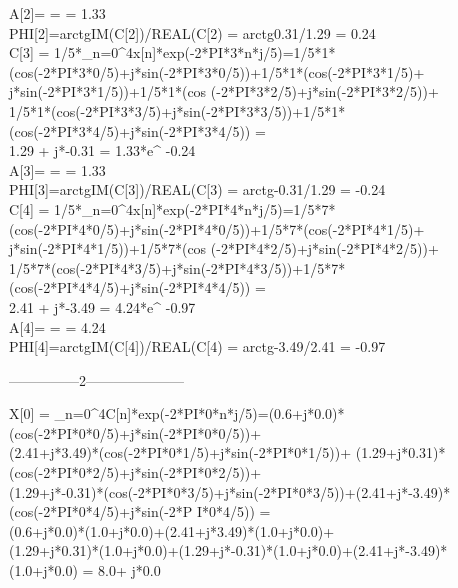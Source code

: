 \documentclass[landscape,12pt]{article}
\begin{document}
A[2]=\sqrt{REAL(C[2])^2+IM(C[2)^2} =  = 1.33\\
PHI[2]=arctg{IM(C[2])/REAL(C[2)} = arctg{0.31/1.29} = 0.24\\

C[3] = 1/5*\sum_{n=0}^{4}{x[n]*exp(-2*PI*3*n*j/5)}=1/5*1*(cos(-2*PI*3*0/5)+j*sin(-2*PI*3*0/5))+1/5*1*(cos(-2*PI*3*1/5)+\\j*sin(-2*PI*3*1/5))+1/5*1*(cos
(-2*PI*3*2/5)+j*sin(-2*PI*3*2/5))+\\1/5*1*(cos(-2*PI*3*3/5)+j*sin(-2*PI*3*3/5))+1/5*1*(cos(-2*PI*3*4/5)+j*sin(-2*PI*3*4/5)) = \\1.29 + j*-0.31 = 1.33*e^
{-0.24}\\

A[3]=\sqrt{REAL(C[3])^2+IM(C[3)^2} =  = 1.33\\
PHI[3]=arctg{IM(C[3])/REAL(C[3)} = arctg{-0.31/1.29} = -0.24\\

C[4] = 1/5*\sum_{n=0}^{4}{x[n]*exp(-2*PI*4*n*j/5)}=1/5*7*(cos(-2*PI*4*0/5)+j*sin(-2*PI*4*0/5))+1/5*7*(cos(-2*PI*4*1/5)+\\j*sin(-2*PI*4*1/5))+1/5*7*(cos
(-2*PI*4*2/5)+j*sin(-2*PI*4*2/5))+\\1/5*7*(cos(-2*PI*4*3/5)+j*sin(-2*PI*4*3/5))+1/5*7*(cos(-2*PI*4*4/5)+j*sin(-2*PI*4*4/5)) =\\ 2.41 + j*-3.49 = 4.24*e^
{-0.97}\\

A[4]=\sqrt{REAL(C[4])^2+IM(C[4)^2} =  = 4.24\\
PHI[4]=arctg{IM(C[4])/REAL(C[4)} = arctg{-3.49/2.41} = -0.97\\


\begin{center}
---------------2---------------------
\end{center}
X[0] = \sum_{n=0}^{4}{C[n]*exp(-2*PI*0*n*j/5)}=(0.6+j*0.0)*(cos(-2*PI*0*0/5)+j*sin(-2*PI*0*0/5))+\\(2.41+j*3.49)*(cos(-2*PI*0*1/5)+j*sin(-2*PI*0*1/5))+
(1.29+j*0.31)*(cos(-2*PI*0*2/5)+j*sin(-2*PI*0*2/5))+\\(1.29+j*-0.31)*(cos(-2*PI*0*3/5)+j*sin(-2*PI*0*3/5))+(2.41+j*-3.49)*(cos(-2*PI*0*4/5)+j*sin(-2*P
I*0*4/5)) =\\ (0.6+j*0.0)*(1.0+j*0.0)+(2.41+j*3.49)*(1.0+j*0.0)+\\(1.29+j*0.31)*(1.0+j*0.0)+(1.29+j*-0.31)*(1.0+j*0.0)+(2.41+j*-3.49)*(1.0+j*0.0) = 8.0+
j*0.0\\
\end{document}

